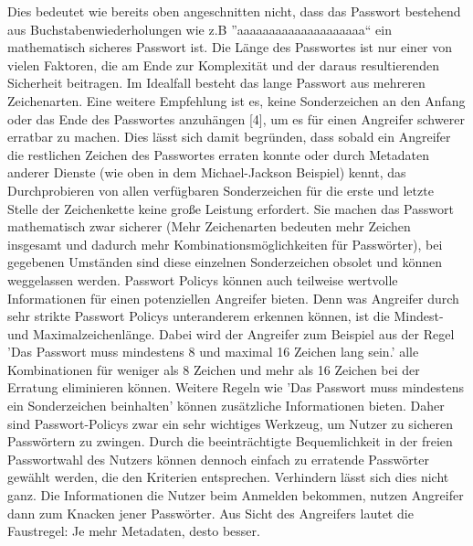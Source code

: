 Dies bedeutet wie bereits oben angeschnitten nicht, dass das Passwort bestehend aus Buchstabenwiederholungen wie z.B ''aaaaaaaaaaaaaaaaaaaa`` ein mathematisch sicheres Passwort ist. Die Länge des Passwortes ist nur einer von vielen Faktoren, die am Ende zur Komplexität und der daraus resultierenden Sicherheit beitragen. Im Idealfall besteht das lange Passwort aus mehreren Zeichenarten. Eine weitere Empfehlung ist es, keine Sonderzeichen an den Anfang oder das Ende des Passwortes anzuhängen [4], um es für einen Angreifer schwerer erratbar zu machen. Dies lässt sich damit begründen, dass sobald ein Angreifer die restlichen Zeichen des Passwortes erraten konnte oder durch Metadaten anderer Dienste (wie oben in dem Michael-Jackson Beispiel) kennt, das Durchprobieren von allen verfügbaren Sonderzeichen für die erste und letzte Stelle der Zeichenkette keine große Leistung erfordert. Sie machen das Passwort mathematisch zwar sicherer (Mehr Zeichenarten bedeuten mehr Zeichen insgesamt und dadurch mehr Kombinationsmöglichkeiten für Passwörter), bei gegebenen Umständen sind diese einzelnen Sonderzeichen obsolet und können weggelassen werden.
Passwort Policys können auch teilweise wertvolle Informationen für einen potenziellen Angreifer bieten. Denn was Angreifer durch sehr strikte Passwort Policys unteranderem erkennen können, ist die Mindest- und Maximalzeichenlänge. Dabei wird der Angreifer zum Beispiel aus der Regel 'Das Passwort muss mindestens 8 und maximal 16 Zeichen lang sein.' alle Kombinationen für weniger als 8 Zeichen und mehr als 16 Zeichen bei der Erratung eliminieren können. Weitere Regeln wie 'Das Passwort muss mindestens ein Sonderzeichen beinhalten' können zusätzliche Informationen bieten. Daher sind Passwort-Policys zwar ein sehr wichtiges Werkzeug, um Nutzer zu sicheren Passwörtern zu zwingen. Durch die beeinträchtigte Bequemlichkeit in der freien Passwortwahl des Nutzers können dennoch einfach zu erratende Passwörter gewählt werden, die den Kriterien entsprechen. Verhindern lässt sich dies nicht ganz. Die Informationen die Nutzer beim Anmelden bekommen, nutzen Angreifer dann zum Knacken jener Passwörter. Aus Sicht des Angreifers lautet die Faustregel: Je mehr Metadaten, desto besser.

\newpage

